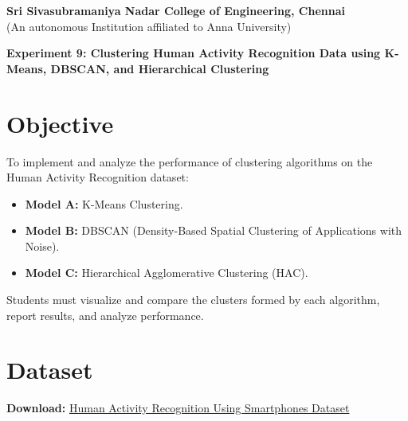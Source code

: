 \documentclass[11pt]{article}
\begin{document}
\begin{center}
    \Large \textbf{Sri Sivasubramaniya Nadar College of Engineering, Chennai} \\
    \large (An autonomous Institution affiliated to Anna University) \\
    \vspace{0.3cm}
\end{center}
\begin{table}[h]
\renewcommand{\arraystretch}{1.4}
\end{table}
\begin{center}
    \textbf{Experiment 9: Clustering Human Activity Recognition Data using K-Means, DBSCAN, and Hierarchical Clustering}
\end{center}

\section*{Objective}
To implement and analyze the performance of clustering algorithms on the Human Activity Recognition dataset:
\begin{itemize}
    \item \textbf{Model A:} K-Means Clustering.
    \item \textbf{Model B:} DBSCAN (Density-Based Spatial Clustering of Applications with Noise).
    \item \textbf{Model C:} Hierarchical Agglomerative Clustering (HAC).
\end{itemize}
Students must visualize and compare the clusters formed by each algorithm, report results, and analyze performance.

\section*{Dataset}
\textbf{Download:} \href{https://archive.ics.uci.edu/dataset/240/human+activity+recognition+using+smartphones}{Human Activity Recognition Using Smartphones Dataset}  
\end{document}
